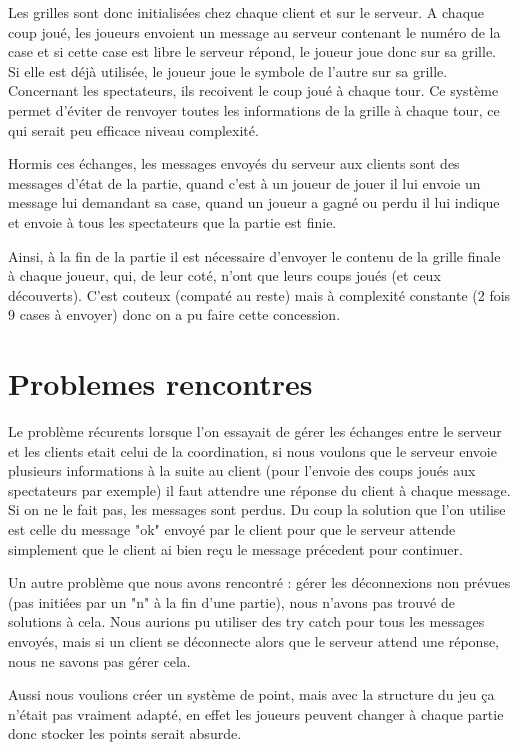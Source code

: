 \documentclass[10pt,a4paper]{article} %
\begin{document}
    Les grilles sont donc initialisées chez chaque client et sur le serveur. A chaque coup joué, les joueurs envoient un message au serveur contenant le numéro de la case et si cette case est libre le serveur répond, le joueur joue donc sur sa grille. Si elle est déjà utilisée, le joueur joue le symbole de l'autre sur sa grille. Concernant les spectateurs, ils recoivent le coup joué à chaque tour. Ce système permet d'éviter de renvoyer toutes les informations de la grille à chaque tour, ce qui serait peu efficace niveau complexité.
    
    Hormis ces échanges, les messages envoyés du serveur aux clients sont des messages d'état de la partie, quand c'est à un joueur de jouer il lui envoie un message lui demandant sa case, quand un joueur a gagné ou perdu il lui indique et envoie à tous les spectateurs que la partie est finie.
    
    Ainsi, à la fin de la partie il est nécessaire d'envoyer le contenu de la grille finale à chaque joueur, qui, de leur coté, n'ont que leurs coups joués (et ceux découverts). C'est couteux (compaté au reste) mais à complexité constante (2 fois 9 cases à envoyer) donc on a pu faire cette concession.
    
    \section{Problemes rencontres}
    Le problème récurents lorsque l'on essayait de gérer les échanges entre le serveur et les clients etait celui de la coordination, si nous voulons que le serveur envoie plusieurs informations à la suite au client (pour l'envoie des coups joués aux spectateurs par exemple) il faut attendre une réponse du client à chaque message. Si on ne le fait pas, les messages sont perdus. Du coup la solution que l'on utilise est celle du message "ok" envoyé par le client pour que le serveur attende simplement que le client ai bien reçu le message précedent pour continuer.
    
    Un autre problème que nous avons rencontré : gérer les déconnexions non prévues (pas initiées par un "n" à la fin d'une partie), nous n'avons pas trouvé de solutions à cela. Nous aurions pu utiliser des try catch pour tous les messages envoyés, mais si un client se déconnecte alors que le serveur attend une réponse, nous ne savons pas gérer cela.
    
    Aussi nous voulions créer un système de point, mais avec la structure du jeu ça n'était pas vraiment adapté, en effet les joueurs peuvent changer à chaque partie donc stocker les points serait absurde.
    
\end{document}
